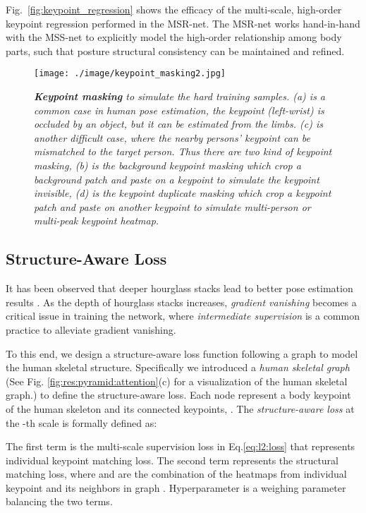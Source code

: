 \documentclass[runningheads]{llncs}
\begin{document}
Fig.~\ref{fig:keypoint_regression} shows the efficacy of the multi-scale, high-order keypoint regression performed in the MSR-net. The MSR-net works hand-in-hand with the MSS-net to explicitly model the high-order relationship among body parts, such that posture structural consistency can be maintained and refined.





\begin{figure}[t]
\centerline{
\texttt{[image: ./image/keypoint\_masking2.jpg]}
}
\caption{\em \small {\bf Keypoint masking} to simulate the hard training samples. (a) is a common case in human pose estimation, the keypoint (left-wrist) is occluded by an object, but it can be estimated from the limbs. (c) is another difficult case, where the nearby persons' keypoint can be mismatched to the target person. Thus there are two kind of keypoint masking, (b) is the background keypoint masking which crop a background patch and paste on a keypoint to simulate the keypoint invisible, (d) is the keypoint duplicate masking which crop a keypoint patch and paste on another keypoint to simulate multi-person or multi-peak keypoint heatmap.}
\label{fig:keypoint_masking}
\end{figure}

\subsection{Structure-Aware Loss}
\label{sec:structure:aware:loss}
It has been observed that deeper hourglass stacks lead to better pose estimation results \cite{newell2016stacked}.
As the depth of hourglass stacks increases, {\em gradient vanishing} becomes a critical issue in training the network, where {\em intermediate supervision} \cite{wei2016convolutional,newell2016stacked,chu2017multi,yang2017learning} is a common practice to alleviate gradient vanishing. 

To this end, we design a structure-aware loss function following a graph to model the human skeletal structure. Specifically we introduced a {\em human skeletal graph}  (See Fig. \ref{fig:res:pyramid:attention}(c) for a visualization of the human skeletal graph.) to define the structure-aware loss. 
Each node  represent a body keypoint of the human skeleton and its connected keypoints, .
The {\em structure-aware loss} at the -th scale is formally defined as:

The first term is the multi-scale supervision loss  in Eq.\ref{eq:l2:loss} that represents individual keypoint matching loss. 
The second term represents the structural matching loss, where  and  are the combination of the heatmaps from individual keypoint  and its neighbors in graph . Hyperparameter  is a weighing parameter balancing the two terms.
\end{document}
